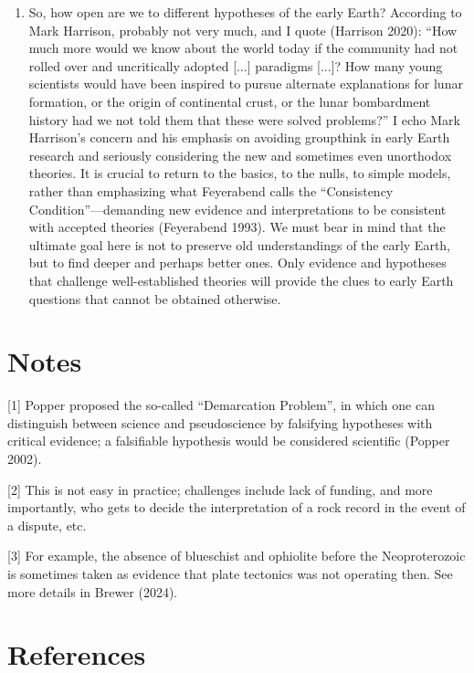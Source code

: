 \documentclass[11pt]{article}
\begin{document}
\begin{enumerate}
\item So, how open are we to different hypotheses of the early Earth? According to Mark Harrison, probably not very much, and I quote (Harrison 2020): ``How much more would we know about the world today if the community had not rolled over and uncritically adopted [...] paradigms [...]? How many young scientists would have been inspired to pursue alternate explanations for lunar formation, or the origin of continental crust, or the lunar bombardment history had we not told them that these were solved problems?'' I echo Mark Harrison's concern and his emphasis on avoiding groupthink in early Earth research and seriously considering the new and sometimes even unorthodox theories. It is crucial to return to the basics, to the nulls, to simple models, rather than emphasizing what Feyerabend calls the ``Consistency Condition''---demanding new evidence and interpretations to be consistent with accepted theories (Feyerabend 1993). We must bear in mind that the ultimate goal here is not to preserve old understandings of the early Earth, but to find deeper and perhaps better ones. Only evidence and hypotheses that challenge well-established theories will provide the clues to early Earth questions that cannot be obtained otherwise.

\end{enumerate}

\section*{Notes}

[1] Popper proposed the so-called ``Demarcation Problem'', in which one can distinguish between science and pseudoscience by falsifying hypotheses with critical evidence; a falsifiable hypothesis would be considered scientific (Popper 2002).

[2] This is not easy in practice; challenges include lack of funding, and more importantly, who gets to decide the interpretation of a rock record in the event of a dispute, etc.

[3] For example, the absence of blueschist and ophiolite before the Neoproterozoic is sometimes taken as evidence that plate tectonics was not operating then. See more details in Brewer (2024).

\section*{References}
\end{document}
